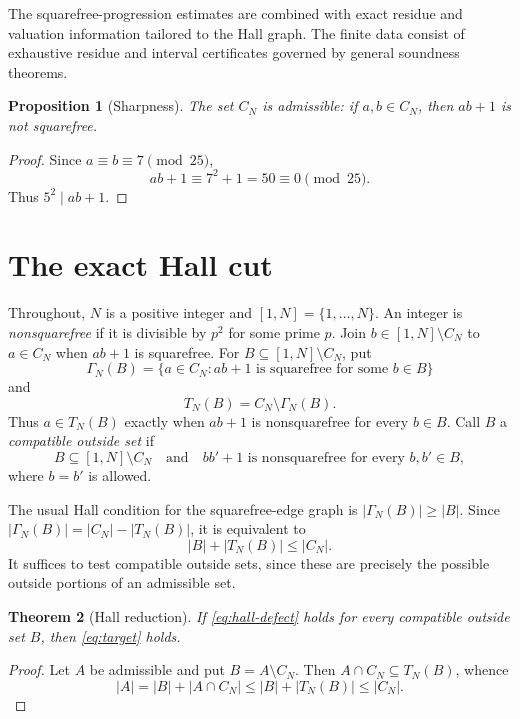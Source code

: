 \documentclass[11pt]{article}
\newtheorem{theorem}{Theorem}[section]
\newtheorem{proposition}[theorem]{Proposition}
\theoremstyle{definition}
\newcommand{\CN}{C_N}
\newcommand{\TN}{T_N}
\begin{document}
The squarefree-progression estimates are combined with exact residue and
valuation information tailored to the Hall graph.  The finite data consist
of exhaustive residue and interval certificates governed by general
soundness theorems.

\begin{proposition}[Sharpness]\label{prop:sharpness}
The set $\CN$ is admissible: if $a,b\in\CN$, then $ab+1$ is not squarefree.
\end{proposition}

\begin{proof}
Since $a\equiv b\equiv7\pmod {25}$,
\[
  ab+1\equiv 7^2+1=50\equiv0\pmod {25}.
\]
Thus $5^2\mid ab+1$.
\end{proof}

\section{The exact Hall cut}

Throughout, $N$ is a positive integer and $[1,N]=\{1,\ldots,N\}$.  An integer
is \emph{nonsquarefree} if it is divisible by $p^2$ for some prime $p$.
Join $b\in[1,N]\setminus\CN$ to $a\in\CN$ when $ab+1$ is squarefree.
For $B\subseteq[1,N]\setminus\CN$, put
\[
  \Gamma_N(B)=\{a\in\CN:\text{$ab+1$ is squarefree for some $b\in B$}\}
\]
and
\[
  \TN(B)=\CN\setminus\Gamma_N(B).
\]
Thus $a\in\TN(B)$ exactly when $ab+1$ is nonsquarefree for every $b\in B$.
Call $B$ a \emph{compatible outside set} if
\[
 B\subseteq[1,N]\setminus\CN
 \quad\text{and}\quad
 bb'+1\text{ is nonsquarefree for every }b,b'\in B,
\]
where $b=b'$ is allowed.

The usual Hall condition for the squarefree-edge graph is
$|\Gamma_N(B)|\geq |B|$.  Since
$|\Gamma_N(B)|=|\CN|-|\TN(B)|$, it is equivalent to
\begin{equation}\label{eq:hall-defect}
  |B|+|\TN(B)|\leq|\CN|.
\end{equation}
It suffices to test compatible outside sets, since these are precisely the
possible outside portions of an admissible set.

\begin{theorem}[Hall reduction]\label{thm:hall-reduction}
If \eqref{eq:hall-defect} holds for every compatible outside set $B$, then
\eqref{eq:target} holds.
\end{theorem}

\begin{proof}
Let $A$ be admissible and put $B=A\setminus\CN$.  Then
$A\cap\CN\subseteq\TN(B)$, whence
\[
 |A|=|B|+|A\cap\CN|
 \leq |B|+|\TN(B)|\leq|\CN|.
\]
\end{proof}
\end{document}
